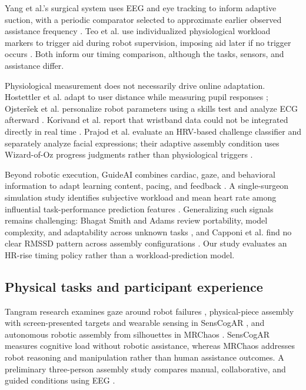 \documentclass[sigconf,anonymous]{aamas}
\begin{document}
Yang et al.'s surgical system uses EEG and eye tracking to inform adaptive suction, with a periodic comparator selected to approximate earlier observed assistance frequency \cite{yang2024}. Teo et al. use individualized physiological workload markers to trigger aid during robot supervision, imposing aid later if no trigger occurs \cite{teo2018}. Both inform our timing comparison, although the tasks, sensors, and assistance differ.

Physiological measurement does not necessarily drive online adaptation. Hostettler et al. adapt to user distance while measuring pupil responses \cite{hostettler2025}; Ojsteršek et al. personalize robot parameters using a skills test and analyze ECG afterward \cite{ojstersek2024}. Korivand et al. report that wristband data could not be integrated directly in real time \cite{korivand2024}. Prajod et al. evaluate an HRV-based challenge classifier and separately analyze facial expressions; their adaptive assembly condition uses Wizard-of-Oz progress judgments rather than physiological triggers \cite{prajod2024}.

Beyond robotic execution, GuideAI combines cardiac, gaze, and behavioral information to adapt learning content, pacing, and feedback \cite{shukla2026}. A single-surgeon simulation study identifies subjective workload and mean heart rate among influential task-performance prediction features \cite{wei2025}. Generalizing such signals remains challenging: Bhagat Smith and Adams review portability, model complexity, and adaptability across unknown tasks \cite{bhagatsmith2026}, and Capponi et al. find no clear RMSSD pattern across assembly configurations \cite{capponi2024}. Our study evaluates an HR-rise timing policy rather than a workload-prediction model.

\subsection{Physical tasks and participant experience}

Tangram research examines gaze around robot failures \cite{tabatabaei2025}, physical-piece assembly with screen-presented targets and wearable sensing in SensCogAR \cite{melo2026}, and autonomous robotic assembly from silhouettes in MRChaos \cite{zhao2025}. SensCogAR measures cognitive load without robotic assistance, whereas MRChaos addresses robot reasoning and manipulation rather than human assistance outcomes. A preliminary three-person assembly study compares manual, collaborative, and guided conditions using EEG \cite{caiazzo2024}.
\end{document}
